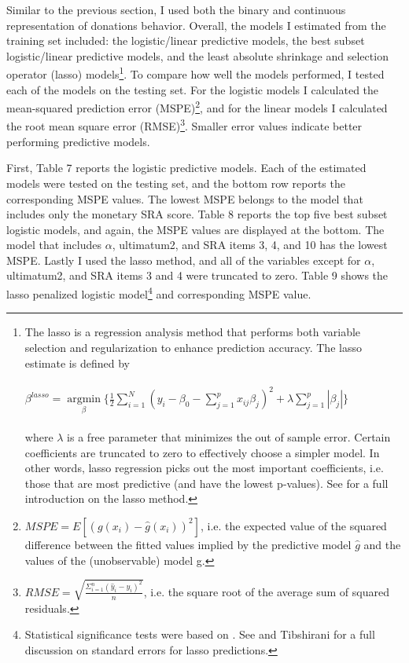 \documentclass[12pt]{article}
\begin{document}
Similar to the previous section, I used both the binary and continuous representation of donations behavior. Overall, the models I estimated from the training set included: the logistic/linear predictive models, the best subset logistic/linear predictive models, and the least absolute shrinkage and selection operator (lasso) models\footnote{The lasso is a regression analysis method that performs both variable selection and regularization to enhance prediction accuracy. The lasso estimate is defined by\\ \\
\( \beta^{lasso}=\mathop\mathrm{argmin}\limits_{\beta} \{ \frac{1}{2} \sum_{i=1}^{N} (y_{i} - \beta_{0} - \sum_{j=1}^{p}x_{ij}\beta _{j})^{2}+\lambda\sum_{j=1}^{p}|\beta _{j}|\} \) \\ \\
where \(\lambda\) is a free parameter that minimizes the out of sample error. Certain coefficients are truncated to zero to effectively choose a simpler model. In other words, lasso regression picks out the most important coefficients, i.e. those that are most predictive (and have the lowest p-values). See \cite{tibshirani_1996} for a full introduction on the lasso method.}. To compare how well the models performed, I tested each of the models on the testing set. For the logistic models I calculated the mean-squared prediction error (MSPE)\footnote{\(MSPE = E[(g(x_{i}) - \hat{g}(x_{i}))^{2}]\), i.e. the expected value of the squared difference between the fitted values implied by the predictive model \(\hat{g}\) and the values of the (unobservable) model g.}, and for the linear models I calculated the root mean square error (RMSE)\footnote{\(RMSE = \sqrt{\frac{\Sigma_{i=1}^{n}{(\hat{y}_{i} - y_{i})^2}}{n}}\), i.e. the square root of the average sum of squared residuals.}. Smaller error values indicate better performing predictive models.

First, Table 7 reports the logistic predictive models. Each of the estimated models were tested on the testing set, and the bottom row reports the corresponding MSPE values. The lowest MSPE belongs to the model that includes only the monetary SRA score. Table 8 reports the top five best subset logistic models, and again, the MSPE values are displayed at the bottom. The model that includes \(\alpha\), ultimatum2, and SRA items 3, 4, and 10 has the lowest MSPE. Lastly I used the lasso method, and all of the variables except for \(\alpha\), ultimatum2, and SRA items 3 and 4 were truncated to zero. Table 9 shows the lasso penalized logistic model\footnote{Statistical significance tests were based on \cite{lockhart_2014}. See \cite{kyung_2010} and Tibshirani for a full discussion on standard errors for lasso predictions.} and corresponding MSPE value.
\end{document}

